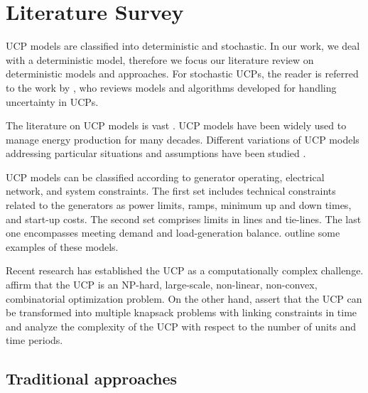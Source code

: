 \section{Literature Survey}
\label{sec:survey}



UCP models are classified into deterministic and stochastic.  In our work, we deal with
a deterministic model, therefore we focus our literature review on deterministic models and approaches. For stochastic UCPs, the reader is referred
to the work by \citet{2019_ijepes_Haberg}, who reviews models and algorithms developed for handling uncertainty in UCPs.

The literature on UCP models is vast \citep{Montero2022}. UCP models have been widely used to manage energy production for many decades. Different variations of UCP models addressing particular situations and assumptions have been studied \citep{Idriss2018}.

UCP models can be classified according to generator operating, electrical network, and system constraints. The first set includes technical constraints related to the generators as power limits, ramps, minimum up and down times, and start-up costs. The second set comprises limits in lines and tie-lines. The last one encompasses meeting demand and load-generation balance. \citet{Anjos2017} outline some examples of these models.

Recent research has established the UCP as a computationally complex challenge. \citet{Anjos2013} affirm that the UCP is an NP-hard, large-scale, non-linear, non-convex, combinatorial optimization problem. On the other hand, \citet{Bendotti2019} assert that the UCP can be transformed into multiple knapsack problems with linking constraints in time and analyze the complexity of the UCP with respect to the number of units and time periods. 


\subsection{Traditional approaches}

